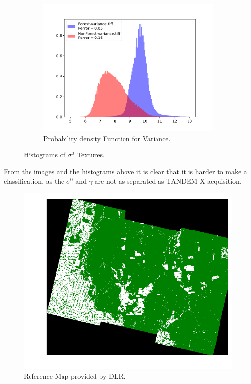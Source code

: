 \begin{figure}[H]
    \centering
    \begin{subfigure}[b]{0.4\linewidth}
        \includegraphics[width=\linewidth]{Chapter5/SENTINEL1/Sigma0/variance_histogram.pdf}
        \caption{Probability density Function for Variance.}
        \end{subfigure}
    \caption{Histograms of $\sigma^0$ Textures.}
    \label{fig: sentinel_sigma_hist}
\end{figure}

From the images and the histograms above it is clear that it is harder to make a classification, as the $\sigma^0$ and $\gamma$ are not as separated as TANDEM-X acquisition.
\begin{figure}[H]
    \centering
    \includegraphics[width=\linewidth]{Chapter5/TANDEM-X/reference_mapimage.pdf}
    \caption{Reference Map provided by DLR.}
    \label{fig:ref_sentinel}
\end{figure}{}

